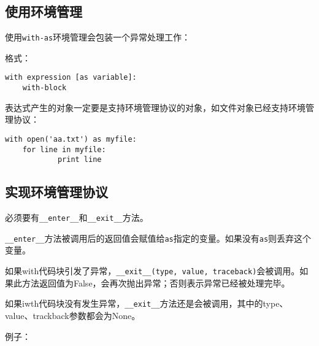 \subsection{使用环境管理}

使用\verb|with-as|环境管理会包装一个异常处理工作：

格式：

\begin{lstlisting}
with expression [as variable]:
	with-block
\end{lstlisting}

表达式产生的对象一定要是支持环境管理协议的对象，如文件对象已经支持环境管理协议：

\begin{lstlisting}
with open('aa.txt') as myfile:
    for line in myfile:
            print line
\end{lstlisting}

\subsection{实现环境管理协议}

必须要有\verb|__enter__|和\verb|__exit__|方法。

\verb|__enter__|方法被调用后的返回值会赋值给\verb|as|指定的变量。如果没有\verb|as|则丢弃这个变量。

如果with代码块引发了异常，\verb|__exit__(type, value, traceback)|会被调用。如果此方法返回值为False，会再次抛出异常；否则表示异常已经被处理完毕。

如果iwth代码块没有发生异常，\verb|__exit__|方法还是会被调用，其中的type、value、trackback参数都会为None。

例子：


